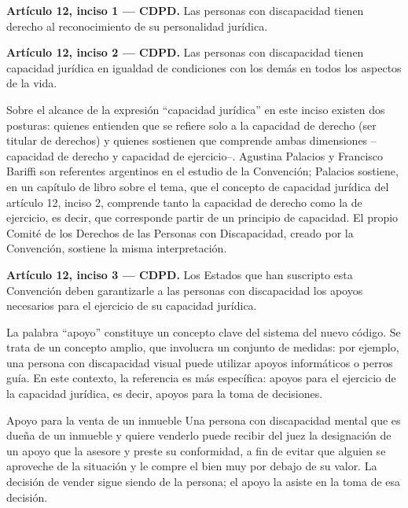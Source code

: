 \documentclass[12pt,oneside]{book}
\begin{document}
\begin{important}
\textbf{Artículo 12, inciso 1 --- CDPD.} Las personas con discapacidad tienen derecho al reconocimiento de su personalidad jurídica.
\end{important}

\begin{important}
\textbf{Artículo 12, inciso 2 --- CDPD.} Las personas con discapacidad tienen capacidad jurídica en igualdad de condiciones con los demás en todos los aspectos de la vida.
\end{important}

Sobre el alcance de la expresión ``capacidad jurídica'' en este inciso existen dos posturas: quienes entienden que se refiere solo a la capacidad de derecho (ser titular de derechos) y quienes sostienen que comprende ambas dimensiones --capacidad de derecho y capacidad de ejercicio--. Agustina Palacios y Francisco Bariffi son referentes argentinos en el estudio de la Convención; Palacios sostiene, en un capítulo de libro sobre el tema, que el concepto de capacidad jurídica del artículo 12, inciso 2, comprende tanto la capacidad de derecho como la de ejercicio, es decir, que corresponde partir de un principio de capacidad. El propio Comité de los Derechos de las Personas con Discapacidad, creado por la Convención, sostiene la misma interpretación.

\begin{important}
\textbf{Artículo 12, inciso 3 --- CDPD.} Los Estados que han suscripto esta Convención deben garantizarle a las personas con discapacidad los apoyos necesarios para el ejercicio de su capacidad jurídica.
\end{important}

La palabra ``apoyo'' constituye un concepto clave del sistema del nuevo código. Se trata de un concepto amplio, que involucra un conjunto de medidas: por ejemplo, una persona con discapacidad visual puede utilizar apoyos informáticos o perros guía. En este contexto, la referencia es más específica: apoyos para el ejercicio de la capacidad jurídica, es decir, apoyos para la toma de decisiones.

\begin{example}{Apoyo para la venta de un inmueble}
Una persona con discapacidad mental que es dueña de un inmueble y quiere venderlo puede recibir del juez la designación de un apoyo que la asesore y preste su conformidad, a fin de evitar que alguien se aproveche de la situación y le compre el bien muy por debajo de su valor. La decisión de vender sigue siendo de la persona; el apoyo la asiste en la toma de esa decisión.
\end{example}
\end{document}
